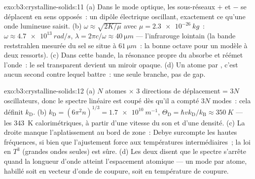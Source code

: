 \begin{solution}{exo:b3:crystalline-solids:11}
(a) Dans le mode optique, les sous-réseaux $+$ et $-$ se déplacent
en sens opposés~: un dipôle électrique oscillant, exactement ce
qu'une onde lumineuse saisit. (b) $\omega \approx \sqrt{2K/\mu}$ avec $\mu =
\qty{2.3e-26}{kg}$~: $\omega \approx \qty{4.7e13}{rad/s}$,
$\lambda = 2\pi c/\omega \approx \qty{40}{\micro m}$ ---
l'infrarouge lointain (la bande reststrahlen mesurée du sel se situe
à $\qty{61}{\micro m}$~: la bonne octave pour un modèle à deux
ressorts). (c) Dans cette bande, la résonance propre du 
absorbe et réémet l'onde~: le sel transparent devient un miroir
opaque. (d) Un atome par , c'est aucun second 
contre lequel battre~: une seule branche, pas de gap.
\end{solution}

\begin{solution}{exo:b3:crystalline-solids:12}
(a) $N$ atomes $\times$ 3 directions de déplacement = $3N$
oscillateurs, donc le spectre linéaire est coupé dès qu'il a compté
$3N$ modes~: cela définit $k_{\text{D}}$. (b)
$k_{\text{D}} = (6\pi^2n)^{1/3} = \qty{1.7e10}{m^{-1}}$,
$\Theta_{\text{D}} = \hbar vk_{\text{D}}/k_{\text{B}} \approx
\qty{350}{K}$ --- les \qty{343}{K} calorimétriques, à partir d'une
vitesse du son et d'une densité. (c) La droite manque
l'aplatissement au bord de zone~: Debye surcompte les hautes
fréquences, si bien que l'ajustement force aux températures
intermédiaires~; la loi en $T^3$ (grandes ondes seules) est sûre.
(d) Les deux disent que le spectre s'arrête quand la longueur d'onde
atteint l'espacement atomique --- un mode par atome, habillé soit en
vecteur d'onde de coupure, soit en température de coupure.
\end{solution}

